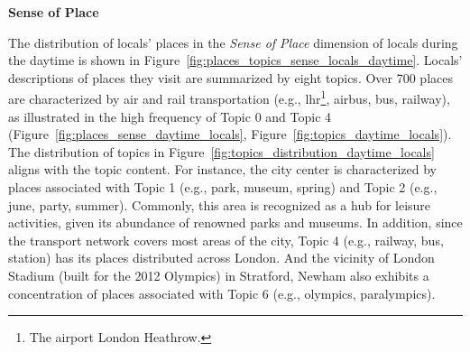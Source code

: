 \documentclass{article}
\theoremstyle{remark}
\begin{document}
\textbf{Sense of Place}

The distribution of locals' places in the \textit{Sense of Place} dimension of locals during the daytime is shown in Figure~\ref{fig:places_topics_sense_locals_daytime}. Locals' descriptions of places they visit are summarized by eight topics. Over 700 places are characterized by air and rail transportation (e.g., lhr\footnote{The airport London Heathrow.}, airbus, bus, railway), as illustrated in the high frequency of Topic 0 and Topic 4 (Figure~\ref{fig:places_sense_daytime_locals}, Figure~\ref{fig:topics_daytime_locals}). The distribution of topics in Figure~\ref{fig:topics_distribution_daytime_locals} aligns with the topic content. For instance, the city center is characterized by places associated with Topic 1 (e.g., park, museum, spring) and Topic 2 (e.g., june, party, summer). Commonly, this area is recognized as a hub for leisure activities, given its abundance of renowned parks and museums. In addition, since the transport network covers most areas of the city, Topic 4 (e.g., railway, bus, station) has its places distributed across London. And the vicinity of London Stadium (built for the 2012 Olympics) in Stratford, Newham also exhibits a concentration of places associated with Topic 6 (e.g., olympics, paralympics).
\end{document}
